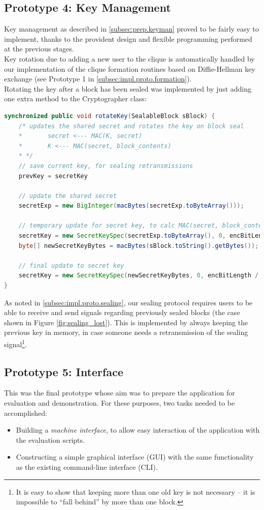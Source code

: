 \documentclass[a4paper, 12pt]{report}
\begin{document}
\subsection{Prototype 4: Key Management}
Key management as described in \cref{subsec:prep.keyman} proved to be fairly easy to implement, thanks to the provident design and flexible programming performed at the previous stages. \\

Key rotation due to adding a new user to the clique is automatically handled by our implementation of the clique formation routines based on Diffie-Hellman key exchange (see Prototype 1 in \cref{subsec:impl.proto.formation}). \\

Rotating the key after a block has been sealed was implemented by just adding one extra method to the Cryptographer class:

\begin{lstlisting}[language=Java, columns=fullflexible]
synchronized public void rotateKey(SealableBlock sBlock) {
    /* updates the shared secret and rotates the key on block seal
    *       secret <--- MAC(K, secret)
    *       K <--- MAC(secret, block_contents)
    * */ 
    // save current key, for sealing retransmissions
    prevKey = secretKey
    
    // update the shared secret
    secretExp = new BigInteger(macBytes(secretExp.toByteArray()));

    // temporary update for secret key, to calc MAC(secret, block_content)
    secretKey = new SecretKeySpec(secretExp.toByteArray(), 0, encBitLength / 8, encAlgo);
    byte[] newSecretKeyBytes = macBytes(sBlock.toString().getBytes());

    // final update to secret key
    secretKey = new SecretKeySpec(newSecretKeyBytes, 0, encBitLength / 8, encAlgo);
}
\end{lstlisting}
As noted in \cref{subsec:impl.proto.sealing}, our sealing protocol requires users to be able to receive and send signals regarding previously sealed blocks (the case shown in Figure \ref{fig:sealing_lost}). This is implemented by always keeping the previous key in memory, in case someone needs a retransmission of the sealing signal\footnote{It is easy to show that keeping more than one old key is not necessary -- it is impossible to ``fall behind'' by more than one block.}.

\subsection{Prototype 5: Interface}
This was the final prototype whose aim was to prepare the application for evaluation and demonstration. For these purposes, two tasks needed to be accomplished:
\begin{itemize}
    \item Building a \emph{machine interface}, to allow easy interaction of the application with the evaluation scripts.
    \item Constructing a simple graphical interface (GUI) with the same functionality as the existing command-line interface (CLI).
\end{itemize}
\end{document}
